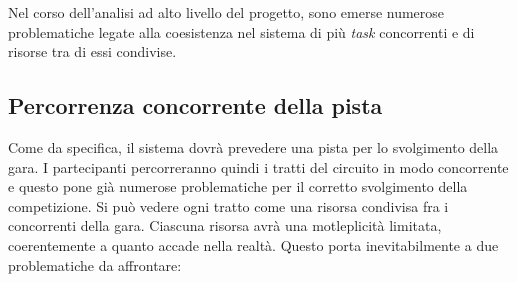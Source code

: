 Nel corso dell'analisi ad alto livello del progetto, sono emerse numerose problematiche legate alla coesistenza nel 
sistema di pi\`{u} \emph{task} concorrenti e di risorse tra di essi condivise. \\
\subsection{Percorrenza concorrente della pista}
Come da specifica, il sistema dovr\`{a} prevedere una pista per lo svolgimento della gara. I partecipanti percorreranno quindi i tratti del circuito in modo concorrente e questo pone gi\`{a} numerose problematiche per il corretto svolgimento della competizione.
Si pu\`{o} vedere ogni tratto come una risorsa condivisa fra i concorrenti della gara. Ciascuna risorsa avr\`{a} una motleplicit\`{a} limitata, coerentemente a quanto accade nella realt\`{a}. Questo porta inevitabilmente a due problematiche da affrontare:
